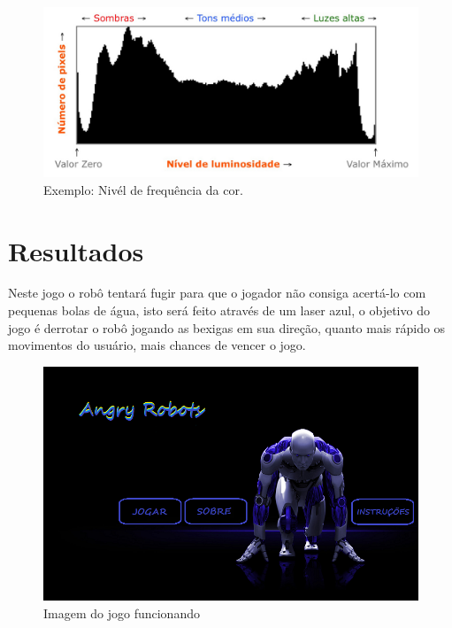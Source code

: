 \documentclass[12pt,openright,oneside,a4paper,brazil]{abntex2}
\begin{document}
\begin{figure}[!htb]
\centering
\includegraphics[scale=0.2]{histograma.jpg}
\caption{Exemplo: Nivél de frequência da cor.}
\end{figure}

\section*{Resultados}

Neste jogo o robô tentará fugir para que o jogador não consiga acertá-lo com pequenas bolas de água, isto será feito através de um laser azul, o objetivo do jogo é derrotar o robô jogando as bexigas em sua direção, quanto mais rápido os movimentos do usuário, mais chances de vencer o jogo.

\begin{figure}[!htb]
\centering
\includegraphics[scale=0.3]{menu.png}
\caption{Imagem do jogo funcionando}
\end{figure}
\vspace{0.5cm}
\end{document}
